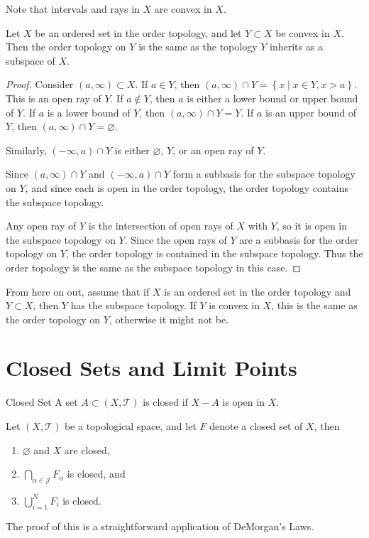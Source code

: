 \documentclass[10pt]{report}
\begin{document}
Note that intervals and rays in $X$ are convex in $X$.

\begin{thrm}{}{}
Let $X$ be an ordered set in the order topology, and let $Y \subset X$ be convex in $X$. Then the order topology on $Y$ is the same as the topology $Y$ inherits as a subspace of $X$.
\end{thrm}
\begin{proof}
	Consider $(a,\infty) \subset X$. If $a \in Y$, then $(a,\infty) \cap Y = \left\{ x \;|\; x\in Y, x > a \right\}$. This is an open ray of $Y$. If $a \not\in Y$, then $a$ is either a lower bound or upper bound of $Y$. If $a$ is a lower bound of $Y$, then $(a,\infty) \cap Y = Y$. If $a$ is an upper bound of $Y$, then $(a,\infty) \cap Y = \varnothing$.

	Similarly, $(-\infty,a) \cap Y$ is either $\varnothing$, $Y$, or an open ray of $Y$.

	Since $(a,\infty)\cap Y$ and $(-\infty,a) \cap Y$ form a subbasis for the subspace topology on $Y$, and since each is open in the order topology, the order topology contains the subspace topology.

	Any open ray of $Y$ is the intersection of open rays of $X$ with $Y$, so it is open in the subspace topology on $Y$. Since the open rays of $Y$ are a subbasis for the order topology on $Y$, the order topology is contained in the subspace topology. Thus the order topology is the same as the subspace topology in this case.
\end{proof}

From here on out, assume that if $X$ is an ordered set in the order topology and $Y \subset X$, then $Y$ has the subspace topology. If $Y$ is convex in $X$, this is the same as the order topology on $Y$, otherwise it might not be.


\section{Closed Sets and Limit Points}

\begin{defn}{Closed Set}{}
	A set $A \subset (X, \mathcal{T})$ is closed if $X-A$ is open in $X$.
\end{defn}

\begin{thrm}{}{}
	Let $(X, \mathcal{T})$ be a topological space, and let $F$ denote a closed set of $X$, then
	\begin{enumerate}
		\item $\varnothing$ and $X$ are closed,
		\item $\bigcap_{\alpha\in\mathcal{J}}F_\alpha$ is closed, and
		\item $\bigcup_{i=1}^N F_i$ is closed.
	\end{enumerate}
\end{thrm}
The proof of this is a straightforward application of DeMorgan's Laws.
\end{document}
